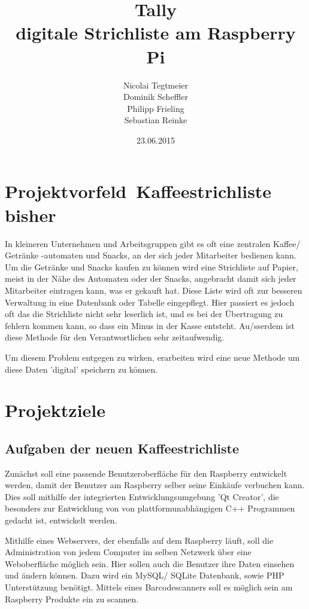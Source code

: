 \documentclass[11pt,a4paper]{article} %
\title{Tally\\ digitale Strichliste am Raspberry Pi}
\author{Nicolai Tegtmeier \\ Dominik Scheffler \\ Philipp Frieling \\ Sebastian Reinke}
\date{23.06.2015}
\begin{document}

\maketitle  %



\section{Projektvorfeld\ Kaffeestrichliste bisher }
\label{Grundlagen}


In kleineren Unternehmen und Arbeitsgruppen gibt es oft eine zentralen Kaffee/ Getr\"anke -automaten und Snacks, an der sich jeder Mitarbeiter bedienen kann. Um die Getr\"anke und Snacks kaufen zu k\"onnen wird eine Strichliste auf Papier, meist in der N\"ahe des Automaten oder der Snacks, angebracht damit sich jeder Mitarbeiter eintragen kann, was er gekauft hat. Diese Liste wird oft zur besseren Verwaltung in eine Datenbank oder Tabelle eingepflegt. Hier passiert es jedoch oft das die Strichliste nicht sehr leserlich ist, und es bei der \"Ubertragung zu fehlern kommen kann, so dass ein Minus in der Kasse entsteht. Au/ss{}erdem ist diese Methode f\"ur den Verantwortlichen sehr zeitaufwendig.
\par
Um diesem Problem entgegen zu wirken, erarbeiten wird eine neue Methode um diese Daten 'digital' speichern zu k\"onnen.


\section{Projektziele }

\subsection{Aufgaben der neuen Kaffeestrichliste}
\label{SchriftAnpassen}

Zun\"achst soll eine passende Benutzeroberfl\"ache f\"ur den Raspberry entwickelt werden, damit der Benutzer am Raspberry selber seine Eink\"aufe verbuchen kann. Dies soll mithilfe der integrierten Entwicklungsumgebung 'Qt Creator', die besonders zur Entwicklung von von plattformunabh\"angigen C++ Programmen gedacht ist, entwickelt werden.
\par
Mithilfe eines Webservers, der ebenfalls auf dem Raspberry l\"auft, soll die Administration von jedem Computer im selben Netzwerk \"uber eine Weboberfl\"ache m\"oglich sein. Hier sollen auch die Benutzer ihre Daten einsehen und \"andern k\"onnen. Dazu wird ein MySQL/ SQLite Datenbank, sowie PHP Unterst\"utzung ben\"otigt. Mittels eines Barcodescanners soll es m\"oglich sein am Raspberry Produkte ein zu scannen.
\end{document}
